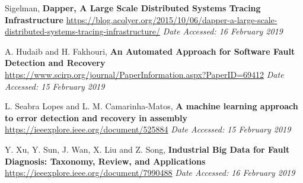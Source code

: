 \documentclass[12pt]{article}
\begin{document}
{\footnotesize
\begin{thebibliography}{9}
  Sigelman, \textbf{Dapper, A Large Scale Distributed Systems Tracing Infrastructure}
  \url{https://blog.acolyer.org/2015/10/06/dapper-a-large-scale-distributed-systems-tracing-infrastructure/}
  \textit{Date Accessed: 16 February 2019}

    A. Hudaib and H. Fakhouri, \textbf{An Automated Approach for Software Fault Detection and Recovery}
    \url{https://www.scirp.org/journal/PaperInformation.aspx?PaperID=69412}
    \textit{Date Accessed: 15 February 2019}

    L. Seabra Lopes and L. M. Camarinha-Matos, \textbf{A machine learning approach to error detection and recovery in assembly}
    \url{https://ieeexplore.ieee.org/document/525884}
    \textit{Date Accessed: 15 February 2019}

    Y. Xu, Y. Sun, J. Wan, X. Liu and Z. Song, \textbf{Industrial Big Data for Fault Diagnosis: Taxonomy, Review, and Applications}
    \url{https://ieeexplore.ieee.org/document/7990488}
    \textit{Date Accessed: 16 February 2019}
\end{thebibliography}
}
\end{document}
